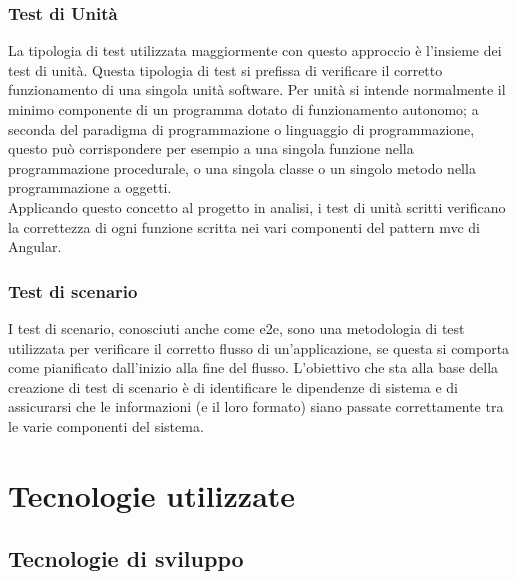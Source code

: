 \subsubsection{Test di Unità}
La tipologia di test utilizzata maggiormente con questo approccio è l'insieme dei test di unità. Questa tipologia di test si prefissa di verificare il corretto funzionamento di una singola unità software. Per unità si intende normalmente il minimo componente di un programma dotato di funzionamento autonomo; a seconda del paradigma di programmazione o linguaggio di programmazione, questo può corrispondere per esempio a una singola funzione nella programmazione procedurale, o una singola classe o un singolo metodo nella programmazione a oggetti.\\
Applicando questo concetto al progetto in analisi, i test di unità scritti verificano la correttezza di ogni funzione scritta nei vari componenti del pattern \gls{mvc} di Angular. 

\subsubsection{Test di scenario}
I test di scenario, conosciuti anche come \gls{e2e}, sono una metodologia di test utilizzata per verificare il corretto flusso di un’applicazione, se questa si comporta come pianificato dall’inizio alla fine del flusso. L’obiettivo che sta alla base della creazione di test di scenario è di identificare  le dipendenze di sistema e di assicurarsi che le informazioni (e il loro formato) siano passate correttamente tra le varie componenti del sistema.


\section{Tecnologie utilizzate}
\subsection{Tecnologie di sviluppo}
